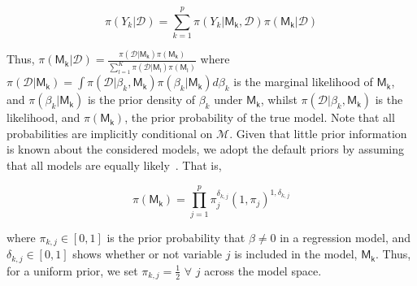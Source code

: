 \documentclass[a4paper, 12pt]{article}
\begin{document}
    \begin{equation}
        \label{equ19:bma}
        \pi(Y_k | \mathcal{D}) = \sum_{k = 1}^p \pi(Y_k | \mathsf{M_k}, \mathcal{D}) \pi(\mathsf{M_k} | \mathcal{D})
    \end{equation}

    Thus, $\pi(\mathsf{M_k} | \mathcal{D}) = \frac{\pi(\mathcal{D} | \mathsf{M_k}) \pi(\mathsf{M_k})}{\sum_{l = 1}^K \pi(\mathcal{D} | \mathsf{M_l}) \pi(\mathsf{M_l})}$ where $\pi(\mathcal{D} | \mathsf{M_k}) = \int\pi(\mathcal{D} | \beta_k, \mathsf{M_k}) \pi(\beta_k | \mathsf{M_k})d \beta_k$ is the marginal likelihood of $\mathsf{M_k}$, and $\pi(\beta_k | \mathsf{M_k})$ is the prior density of $\beta_k$ under $\mathsf{M_k}$, whilst $\pi(\mathcal{D} | \beta_k, \mathsf{M_k})$ is the likelihood, and $\pi(\mathsf{M_k})$, the prior probability of the true model. Note that all probabilities are implicitly conditional on $\mathcal{M}$. Given that little prior information is known about the considered models, we adopt the default priors by assuming that all models are equally likely~\parencite{hoeting1999}. That is,

    \begin{equation}
        \label{equ20:default-priors}
        \pi(\mathsf{M_k}) = \prod_{j = 1}^p \pi_{j}^{\delta_{k, j}} (1, \pi_j)^{1, \delta_{k, j}}
    \end{equation}

    where $\pi_{k, j} \in [0,1]$ is the prior probability that $\beta \neq 0$ in a regression model, and $\delta_{k, j} \in [0,1]$ shows whether or not variable $j$ is included in the model, $\mathsf{M_k}$. Thus, for a uniform prior, we set $\pi_{k, j} = \frac{1}{2}$ $\forall$ $j$ across the model space.
\end{document}
